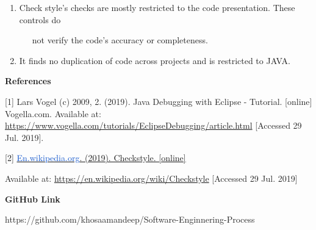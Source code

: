 \documentclass[12pt]{article}
\begin{document}
\begin{enumerate}
	\item Check style's checks are mostly restricted to the code presentation. These controls do \par

\ \ \  not verify the code's accuracy or completeness.\par

	\item It finds no duplication of code across projects and is restricted to JAVA.
\end{enumerate}\par


\vspace{\baselineskip}
{\fontsize{14pt}{16.8pt}\selectfont \textbf{References}\par}\par


\vspace{\baselineskip}
\setlength{\parskip}{8.04pt}
\setlength{\parskip}{0.0pt}
[1] \textcolor[HTML]{222222}{Lars Vogel (c) 2009, 2. (2019). Java Debugging with Eclipse - Tutorial. [online] Vogella.com. Available at: \href{https://www.vogella.com/tutorials/EclipseDebugging/article.html}{https://www.vogella.com/tutorials/EclipseDebugging/article.html} [Accessed 29 Jul. 2019]. }\par

[2] \href{http://en.wikipedia.org/}{\textcolor[HTML]{1155CC}{En.wikipedia.org}. (2019). Checkstyle. [online] }\par

\textcolor[HTML]{222222}{Available at: \href{https://en.wikipedia.org/wiki/Checkstyle}{https://en.wikipedia.org/wiki/Checkstyle} [Accessed 29 Jul. 2019]}\par


\vspace{\baselineskip}
{\fontsize{14pt}{16.8pt}\selectfont \textbf{\textcolor[HTML]{222222}{GitHub Link}}\par}\par


\vspace{\baselineskip}
\textcolor[HTML]{222222}{https://github.com/khosaamandeep/Software-Enginnering-Process}\par


\vspace{\baselineskip}
\\

\vspace{\baselineskip}
\vspace{\baselineskip}

\vspace{\baselineskip}

\vspace{\baselineskip}

\vspace{\baselineskip}

\vspace{\baselineskip}

\vspace{\baselineskip}

\printbibliography
\end{document}
